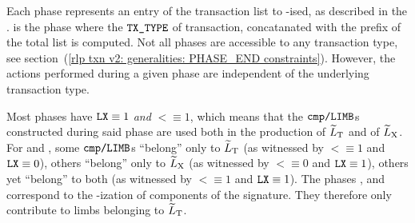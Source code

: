Each phase represents an entry of the transaction list to \rlp{}-ised, as described in the \cite{EYP-London}.
\phaseRlpPrefix{} is the phase where the $\texttt{TX\_TYPE}$ of transaction,
concatanated with the \rlp{} prefix of the total list is computed.
Not all phases are accessible to any transaction type,
see section~(\ref{rlp txn v2: generalities: PHASE_END constraints}).
However, the actions performed during a given phase are independent of the underlying transaction type.

Most phases have $\texttt{LX} \equiv 1$ \emph{and} $\lt \equiv 1$,
which means that the $\texttt{cmp}\texttt{/}\texttt{{\texttt{LIMB}}}$s constructed during said phase
are used both in the production of
$\widetilde{L}_{\mathrm{T}}$ and of
$\widetilde{L}_{\mathrm{X}}$.
For \phaseRlpPrefix{} and \phaseBeta{},
some $\texttt{cmp}\texttt{/}\texttt{{\texttt{LIMB}}}$s ``belong'' only to $\widetilde{L}_{\mathrm{T}}$ (as witnessed by $\lt \equiv 1$ and $\texttt{LX} \equiv 0$),
others        ``belong'' only to $\widetilde{L}_{\mathrm{X}}$ (as witnessed by $\lt \equiv 0$ and $\texttt{LX} \equiv 1$),
others yet    ``belong'' to both               (as witnessed by $\lt \equiv 1$ and $\texttt{LX} \equiv 1$).
The phases \phaseY{}, \phaseR{} and \phaseS{} correspond to the \rlp{}-ization of components of the signature.
They therefore only contribute to limbs belonging to $\widetilde{L}_{\mathrm{T}}$.

